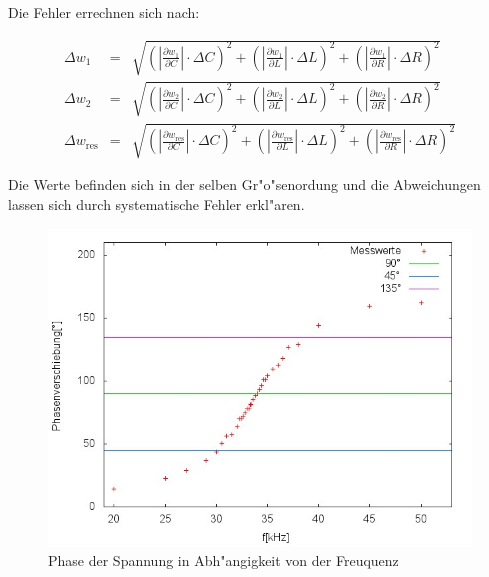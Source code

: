 	Die Fehler errechnen sich nach:

	\begin{eqnarray*}
		\Delta w_1 &=& \sqrt{ \left( |\frac{\partial w_1}{\partial C}| \cdot \Delta C\right)^2 + \left( |\frac{\partial w_1}{\partial L}| \cdot \Delta L \right)^2 + \left( |\frac{\partial w_1}{\partial R}| \cdot \Delta R \right)^2}\\
		\Delta w_2 &=& \sqrt{ \left( |\frac{\partial w_2}{\partial C}| \cdot \Delta C\right)^2 + \left( |\frac{\partial w_2}{\partial L}| \cdot \Delta L \right)^2 + \left( |\frac{\partial w_2}{\partial R}| \cdot \Delta R \right)^2}\\
		\Delta w_\mathrm{res} &=& \sqrt{ \left( |\frac{\partial w_\mathrm{res}}{\partial C}| \cdot \Delta C\right)^2 + \left( |\frac{\partial w_\mathrm{res}}{\partial L}| \cdot \Delta L \right)^2 + \left( |\frac{\partial w_\mathrm{res}}{\partial R}| \cdot \Delta R \right)^2}
	\end{eqnarray*}

	Die Werte befinden sich in der selben Gr"o"senordung und die Abweichungen lassen sich durch systematische Fehler erkl"aren.

	\begin{figure}[htbp]
		\centering
		\includegraphics[width = 12cm]{img/graph_d.jpg}
		\caption{Phase der Spannung in Abh"angigkeit von der Freuquenz}
		\label{phase}
	\end{figure}

	